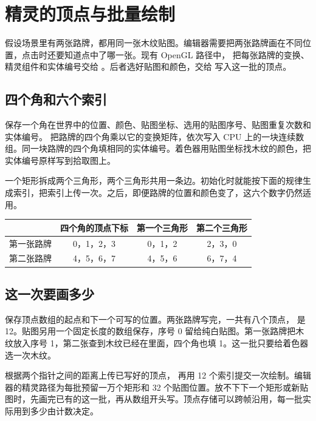 \clearpage
\section{精灵的顶点与批量绘制}\label{sec:data-renderer}
假设场景里有两张路牌，都用同一张木纹贴图。编辑器需要把两张路牌画在不同位置，点击时还要知道点中了哪一张。现有 OpenGL 路径中， 把每张路牌的变换、精灵组件和实体编号交给 。后者选好贴图和颜色，交给  写入这一批的顶点。

\subsection{四个角和六个索引}
 保存一个角在世界中的位置、颜色、贴图坐标、选用的贴图序号、贴图重复次数和实体编号。 把路牌的四个角乘以它的变换矩阵，依次写入 CPU 上的一块连续数组。同一块路牌的四个角填相同的实体编号。着色器用贴图坐标找木纹的颜色，把实体编号原样写到拾取图上。

一个矩形拆成两个三角形，两个三角形共用一条边。初始化时就能按下面的规律生成索引，把索引上传一次。之后，即便路牌的位置和颜色变了，这六个数字仍然适用。

\begin{center}
\small\begin{tabular}{@{}lccc@{}}
\toprule
 & 四个角的顶点下标 & 第一个三角形 & 第二个三角形 \\
\midrule
第一张路牌 & 0，1，2，3 & 0，1，2 & 2，3，0 \\
第二张路牌 & 4，5，6，7 & 4，5，6 & 6，7，4 \\
\bottomrule
\end{tabular}
\end{center}

\subsection{这一次要画多少}
 保存顶点数组的起点和下一个可写的位置。两张路牌写完，一共有八个顶点， 是 12。贴图另用一个固定长度的数组保存，序号 0 留给纯白贴图。第一张路牌把木纹放入序号 1，第二张查到木纹已经在里面，四个角也填 1。这一批只要给着色器选一次木纹。

 根据两个指针之间的距离上传已写好的顶点， 再用 12 个索引提交一次绘制。编辑器的精灵路径为每批预留一万个矩形和 32 个贴图位置。放不下下一个矩形或新贴图时，先画完已有的这一批，再从数组开头写。顶点存储可以跨帧沿用，每一批实际用到多少由计数决定。
